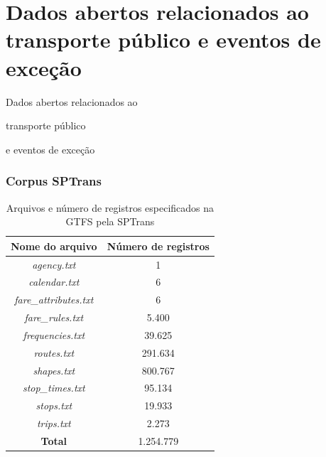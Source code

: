 \documentclass{beamer}
\begin{document}
\section{Dados abertos relacionados ao transporte público e eventos de exceção}
\begin{frame}
\Huge{\centerline{Dados abertos relacionados ao}}
\Huge{\centerline{transporte público}}
\Huge{\centerline{e eventos de exceção}}
\end{frame}
\begin{frame}
\frametitle{Corpus SPTrans}
\begin{table}[!htb]
\centering
\caption{Arquivos e número de registros especificados na GTFS pela SPTrans}
	\label{tab:gtfs}
\begin{tabular}{c|c}
\toprule
\textbf{Nome do arquivo} & \textbf{Número de registros} \\ 
\midrule
\textit{agency.txt} & 1 \\ 
\hline
\textit{calendar.txt} & 6 \\ 
\hline
\textit{fare\_attributes.txt} & 6 \\ 
\hline
\textit{fare\_rules.txt} & 5.400 \\
\hline
\textit{frequencies.txt} & 39.625 \\
\hline
\textit{routes.txt} & 291.634 \\
\hline
\textit{shapes.txt} & 800.767 \\
\hline
\textit{stop\_times.txt} & 95.134 \\  
\hline
\textit{stops.txt} & 19.933 \\ 
\hline
\textit{trips.txt} & 2.273 \\
\midrule
\midrule
\textbf{Total} & 1.254.779 \\
\bottomrule
\end{tabular}
\end{table}
\end{frame}
\end{document}
